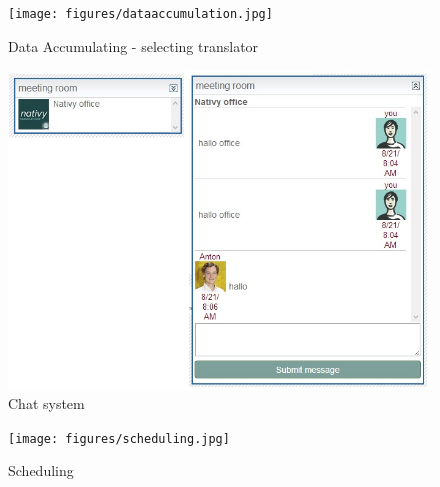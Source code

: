 \begin{figure}[h]
\begin{center}
\texttt{[image: figures/dataaccumulation.jpg]}
\caption{Data Accumulating - selecting translator
\label{fig:dataaccumulating}}
\includegraphics[scale=\figurescaling]{figures/chat.jpg}
\caption{Chat system
\label{fig:chat}}
\end{center}
\end{figure}


\begin{figure}[h]
\begin{center}
\texttt{[image: figures/scheduling.jpg]}
\caption{Scheduling
\label{fig:scheduling}}
\end{center}
\end{figure}